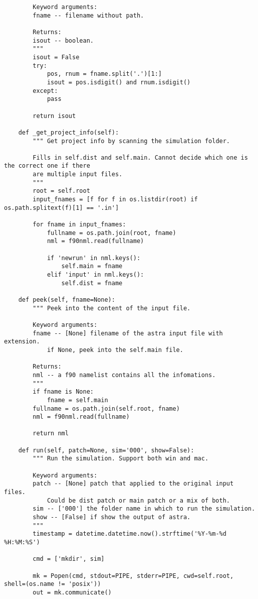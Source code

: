 \begin{footnotesize}
\begin{verbatim}
        Keyword arguments:
        fname -- filename without path.

        Returns:
        isout -- boolean.
        """
        isout = False
        try:
            pos, rnum = fname.split('.')[1:]
            isout = pos.isdigit() and rnum.isdigit()
        except:
            pass

        return isout

    def _get_project_info(self):
        """ Get project info by scanning the simulation folder.

        Fills in self.dist and self.main. Cannot decide which one is the correct one if there
        are multiple input files.
        """
        root = self.root
        input_fnames = [f for f in os.listdir(root) if os.path.splitext(f)[1] == '.in']

        for fname in input_fnames:
            fullname = os.path.join(root, fname)
            nml = f90nml.read(fullname)

            if 'newrun' in nml.keys():
                self.main = fname
            elif 'input' in nml.keys():
                self.dist = fname

    def peek(self, fname=None):
        """ Peek into the content of the input file.

        Keyword arguments:
        fname -- [None] filename of the astra input file with extension.
            if None, peek into the self.main file.

        Returns:
        nml -- a f90 namelist contains all the infomations.
        """
        if fname is None:
            fname = self.main
        fullname = os.path.join(self.root, fname)
        nml = f90nml.read(fullname)

        return nml

    def run(self, patch=None, sim='000', show=False):
        """ Run the simulation. Support both win and mac.

        Keyword arguments:
        patch -- [None] patch that applied to the original input files.
            Could be dist patch or main patch or a mix of both.
        sim -- ['000'] the folder name in which to run the simulation.
        show -- [False] if show the output of astra.
        """
        timestamp = datetime.datetime.now().strftime('%Y-%m-%d %H:%M:%S')

        cmd = ['mkdir', sim]

        mk = Popen(cmd, stdout=PIPE, stderr=PIPE, cwd=self.root, shell=(os.name != 'posix'))
        out = mk.communicate()


\end{verbatim}
\end{footnotesize}
